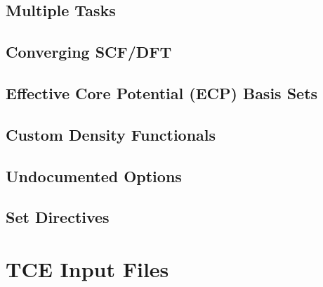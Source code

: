 \documentclass[letterpaper,12pt]{article}
\begin{document}
\subsection{Multiple Tasks}\label{sec:MultipleTasks}

\newpage

\subsection{Converging SCF/DFT}\label{sec:ConvergingSCF}

\newpage

\subsection{Effective Core Potential (ECP) Basis Sets}\label{sec:ECPBasisSets}

\newpage

\subsection{Custom Density Functionals}\label{sec:CustomDensityFunctionals}

\newpage

\subsection{Undocumented Options}\label{sec:UndocumentedOptions}

\newpage

\subsection{Set Directives}\label{sec:SetDirectives}

\newpage

\section{TCE Input Files}\label{sec:TCEInputFiles}

\newpage
\end{document}
